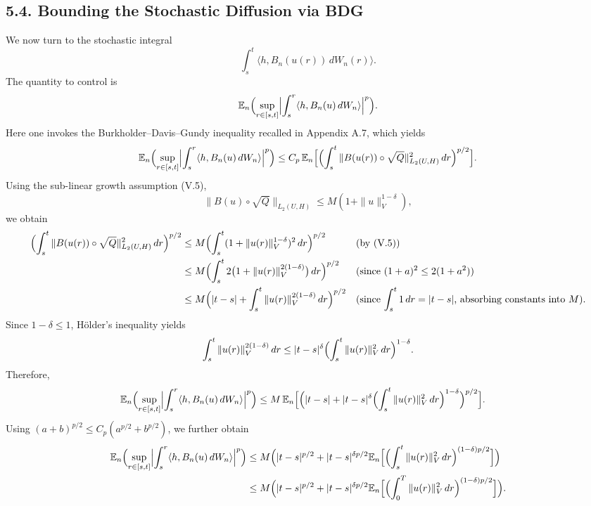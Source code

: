 \documentclass[11pt]{article}
\theoremstyle{definition}
\theoremstyle{remark}
\begin{document}
\subsection*{5.4. Bounding the Stochastic Diffusion via BDG}
We now turn to the stochastic integral
\[
  \int_s^t \langle h,B_n(u(r))\,dW_n(r)\rangle.
\]
The quantity to control is
\[
  \mathbb E_n\Bigl(
    \sup_{r\in[s,t]}
    \Bigl|
      \int_s^r \langle h,B_n(u)\,dW_n\rangle
    \Bigr|^p
  \Bigr).
\]
Here one invokes the Burkholder--Davis--Gundy inequality recalled in Appendix A.7, which yields
\[
  \mathbb E_n\Bigl(
    \sup_{r\in[s,t]}
    \Bigl|
      \int_s^r \langle h,B_n(u)\,dW_n\rangle
    \Bigr|^p
  \Bigr)
  \le
  C_p\,
  \mathbb E_n\Bigl[
    \Bigl(
      \int_s^t \|B(u(r))\circ\sqrt Q\|_{L_2(U,H)}^2\,dr
    \Bigr)^{p/2}
  \Bigr].
\]
Using the sub-linear growth assumption (V.5),
\[
  \|B(u)\circ\sqrt Q\|_{L_2(U,H)}
  \le
  M(1+\|u\|_V^{1-\delta}),
\]
we obtain
\begin{align*}
  \Bigl(
    \int_s^t \|B(u(r))\circ\sqrt Q\|_{L_2(U,H)}^2\,dr
  \Bigr)^{p/2}
  &\le
  M
  \Bigl(
    \int_s^t (1+\|u(r)\|_V^{1-\delta})^2\,dr
  \Bigr)^{p/2}
  &&\text{(by (V.5))} \\
  &\le
  M
  \Bigl(
    \int_s^t 2\bigl(1+\|u(r)\|_V^{2(1-\delta)}\bigr)\,dr
  \Bigr)^{p/2}
  &&\text{(since $(1+a)^2\le 2(1+a^2)$)} \\
  &\le
  M
  \Bigl(
    |t-s|+\int_s^t \|u(r)\|_V^{2(1-\delta)}\,dr
  \Bigr)^{p/2}
  &&\text{(since $\int_s^t 1\,dr=|t-s|$, absorbing constants into $M$)}.
\end{align*}
Since $1-\delta\le 1$, H\"older's inequality yields
\[
  \int_s^t \|u(r)\|_V^{2(1-\delta)}\,dr
  \le
  |t-s|^\delta
  \Bigl(\int_s^t \|u(r)\|_V^2\,dr\Bigr)^{1-\delta}.
\]
Therefore,
\begin{align*}
  \mathbb E_n\Bigl(
    \sup_{r\in[s,t]}
    \Bigl|
      \int_s^r \langle h,B_n(u)\,dW_n\rangle
    \Bigr|^p
  \Bigr)
  &\le
  M\,
  \mathbb E_n\Bigl[
    \Bigl(
      |t-s|
      +
      |t-s|^\delta
      \Bigl(\int_s^t \|u(r)\|_V^2\,dr\Bigr)^{1-\delta}
    \Bigr)^{p/2}
  \Bigr].
\end{align*}
Using $(a+b)^{p/2}\le C_p(a^{p/2}+b^{p/2})$, we further obtain
\begin{align*}
  \mathbb E_n\Bigl(
    \sup_{r\in[s,t]}
    \Bigl|
      \int_s^r \langle h,B_n(u)\,dW_n\rangle
    \Bigr|^p
  \Bigr)
  &\le
  M\Bigl(
    |t-s|^{p/2}
    +
    |t-s|^{\delta p/2}
    \mathbb E_n\Bigl[
      \Bigl(\int_s^t \|u(r)\|_V^2\,dr\Bigr)^{(1-\delta)p/2}
    \Bigr]
  \Bigr) \\
  &\le
  M\Bigl(
    |t-s|^{p/2}
    +
    |t-s|^{\delta p/2}
    \mathbb E_n\Bigl[
      \Bigl(\int_0^T \|u(r)\|_V^2\,dr\Bigr)^{(1-\delta)p/2}
    \Bigr]
  \Bigr).
\end{align*}
\end{document}
